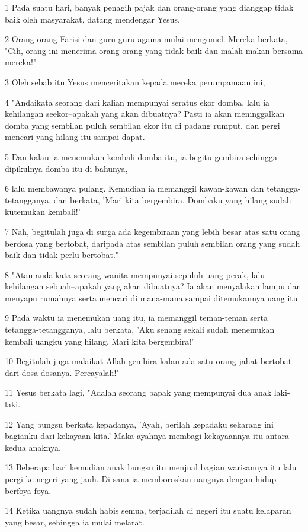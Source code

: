 \par 1 Pada suatu hari, banyak penagih pajak dan orang-orang yang dianggap tidak baik oleh masyarakat, datang mendengar Yesus.
\par 2 Orang-orang Farisi dan guru-guru agama mulai mengomel. Mereka berkata, "Cih, orang ini menerima orang-orang yang tidak baik dan malah makan bersama mereka!"
\par 3 Oleh sebab itu Yesus menceritakan kepada mereka perumpamaan ini,
\par 4 "Andaikata seorang dari kalian mempunyai seratus ekor domba, lalu ia kehilangan seekor--apakah yang akan dibuatnya? Pasti ia akan meninggalkan domba yang sembilan puluh sembilan ekor itu di padang rumput, dan pergi mencari yang hilang itu sampai dapat.
\par 5 Dan kalau ia menemukan kembali domba itu, ia begitu gembira sehingga dipikulnya domba itu di bahunya,
\par 6 lalu membawanya pulang. Kemudian ia memanggil kawan-kawan dan tetangga-tetangganya, dan berkata, 'Mari kita bergembira. Dombaku yang hilang sudah kutemukan kembali!'
\par 7 Nah, begitulah juga di surga ada kegembiraan yang lebih besar atas satu orang berdosa yang bertobat, daripada atas sembilan puluh sembilan orang yang sudah baik dan tidak perlu bertobat."
\par 8 "Atau andaikata seorang wanita mempunyai sepuluh uang perak, lalu kehilangan sebuah--apakah yang akan dibuatnya? Ia akan menyalakan lampu dan menyapu rumahnya serta mencari di mana-mana sampai ditemukannya uang itu.
\par 9 Pada waktu ia menemukan uang itu, ia memanggil teman-teman serta tetangga-tetangganya, lalu berkata, 'Aku senang sekali sudah menemukan kembali uangku yang hilang. Mari kita bergembira!'
\par 10 Begitulah juga malaikat Allah gembira kalau ada satu orang jahat bertobat dari dosa-dosanya. Percayalah!"
\par 11 Yesus berkata lagi, "Adalah seorang bapak yang mempunyai dua anak laki-laki.
\par 12 Yang bungsu berkata kepadanya, 'Ayah, berilah kepadaku sekarang ini bagianku dari kekayaan kita.' Maka ayahnya membagi kekayaannya itu antara kedua anaknya.
\par 13 Beberapa hari kemudian anak bungsu itu menjual bagian warisannya itu lalu pergi ke negeri yang jauh. Di sana ia memboroskan uangnya dengan hidup berfoya-foya.
\par 14 Ketika uangnya sudah habis semua, terjadilah di negeri itu suatu kelaparan yang besar, sehingga ia mulai melarat.
